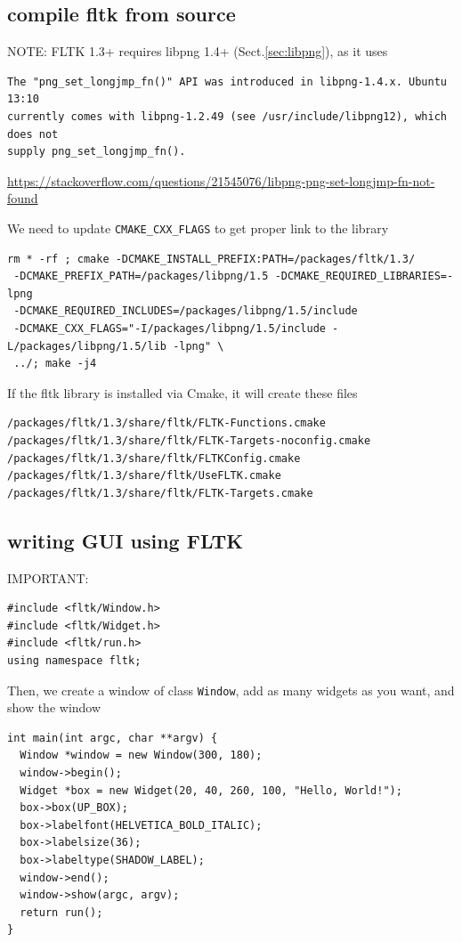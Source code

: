\subsection{compile fltk from source}
\label{sec:fltk-compile}

NOTE: FLTK 1.3+ requires libpng 1.4+ (Sect.\ref{sec:libpng}), as it uses
\begin{verbatim}
The "png_set_longjmp_fn()" API was introduced in libpng-1.4.x. Ubuntu 13:10
currently comes with libpng-1.2.49 (see /usr/include/libpng12), which does not
supply png_set_longjmp_fn(). 
\end{verbatim}
\url{https://stackoverflow.com/questions/21545076/libpng-png-set-longjmp-fn-not-found}

We need to update \verb!CMAKE_CXX_FLAGS! to get proper link to the library
\begin{verbatim}
rm * -rf ; cmake -DCMAKE_INSTALL_PREFIX:PATH=/packages/fltk/1.3/
 -DCMAKE_PREFIX_PATH=/packages/libpng/1.5 -DCMAKE_REQUIRED_LIBRARIES=-lpng
 -DCMAKE_REQUIRED_INCLUDES=/packages/libpng/1.5/include
 -DCMAKE_CXX_FLAGS="-I/packages/libpng/1.5/include -L/packages/libpng/1.5/lib -lpng" \
 ../; make -j4 
\end{verbatim}

If the fltk library is installed via Cmake, it will create these files
\begin{verbatim}
/packages/fltk/1.3/share/fltk/FLTK-Functions.cmake
/packages/fltk/1.3/share/fltk/FLTK-Targets-noconfig.cmake
/packages/fltk/1.3/share/fltk/FLTKConfig.cmake
/packages/fltk/1.3/share/fltk/UseFLTK.cmake
/packages/fltk/1.3/share/fltk/FLTK-Targets.cmake
\end{verbatim}

\subsection{writing GUI using FLTK}

IMPORTANT:
\begin{verbatim}
#include <fltk/Window.h>
#include <fltk/Widget.h>
#include <fltk/run.h>
using namespace fltk;
\end{verbatim}

Then, we create a window of class \verb!Window!, add as many widgets as you
want, and show the window
\begin{verbatim}
int main(int argc, char **argv) {
  Window *window = new Window(300, 180);
  window->begin();
  Widget *box = new Widget(20, 40, 260, 100, "Hello, World!");
  box->box(UP_BOX);
  box->labelfont(HELVETICA_BOLD_ITALIC);
  box->labelsize(36);
  box->labeltype(SHADOW_LABEL);
  window->end();
  window->show(argc, argv);
  return run();
}
\end{verbatim}

